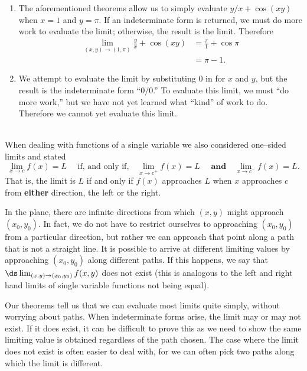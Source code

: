 {\begin{enumerate}
	\item The aforementioned theorems allow us to simply evaluate $y/x+\cos(xy)$ when $x=1$ and $y=\pi$. If an indeterminate form is returned, we must do more work to evaluate the limit; otherwise, the result is the limit. Therefore
	\begin{align*}
	\lim_{(x,y)\to (1,\pi)} \frac yx + \cos(xy)  &= \frac\pi{1}+\cos \pi \\
		&= \pi -1.
	\end{align*}
	\item		We attempt to evaluate the limit by substituting 0 in for $x$ and $y$, but the result is the indeterminate form ``$0/0$.'' To evaluate this limit, we must ``do more work,'' but we have not yet learned what ``kind'' of work to do. Therefore we cannot yet evaluate this limit.
\end{enumerate}
\baselineskip
}\\

When dealing with functions of a single variable we also considered one--sided limits and stated
$$\lim_{x\to c}f(x) = L \quad\text{ if, and only if,}\quad \lim_{x\to c^+}f(x) =L \quad\textbf{ and}\quad \lim_{x\to c^-}f(x) =L.$$
That is, the limit is $L$ if and only if $f(x)$ approaches $L$ when $x$ approaches $c$ from \textbf{either} direction, the left or the right.

In the plane, there are infinite directions from which $(x,y)$ might approach $(x_0,y_0)$. In fact, we do not have to restrict ourselves to approaching $(x_0,y_0)$ from a particular direction, but rather we can approach that point along a path that is not a straight line. It is possible to arrive at different limiting values by approaching $(x_0,y_0)$ along different paths. If this happens, we say that $\ds \lim_{(x,y)\to(x_0,y_0) } f(x,y)$ does not exist (this is analogous to the left and right hand limits of single variable functions not being equal).

Our theorems tell us that we can evaluate most limits quite simply, without worrying about  paths. When indeterminate forms arise, the limit may or may not exist. If it does exist, it can be difficult to prove this as we need to show the same limiting value is obtained regardless of the path chosen. The case where the limit does not exist is often easier to deal with, for we can often pick two paths along which the limit is different.\\

